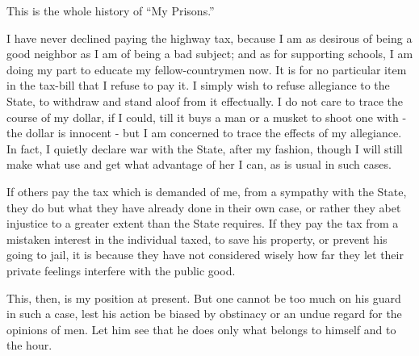 \documentclass[letterpaper,12pt,english]{sphinxmanual}
\begin{document}
This is the whole history of ``My Prisons.''

I have never declined paying the highway tax, because I am as desirous of being a good neighbor as I am of being a bad subject; and as for supporting schools, I am doing my part to educate my fellow-countrymen now. It is for no particular item in the tax-bill that I refuse to pay it. I simply wish to refuse allegiance to the State, to withdraw and stand aloof from it effectually. I do not care to trace the course of my dollar, if I could, till it buys a man or a musket to shoot one with - the dollar is innocent - but I am concerned to trace the effects of my allegiance. In fact, I quietly declare war with the State, after my fashion, though I will still make what use and get what advantage of her I can, as is usual in such cases.

If others pay the tax which is demanded of me, from a sympathy with the State, they do but what they have already done in their own case, or rather they abet injustice to a greater extent than the State requires. If they pay the tax from a mistaken interest in the individual taxed, to save his property, or prevent his going to jail, it is because they have not considered wisely how far they let their private feelings interfere with the public good.

This, then, is my position at present. But one cannot be too much on his guard in such a case, lest his action be biased by obstinacy or an undue regard for the opinions of men. Let him see that he does only what belongs to himself and to the hour.
\end{document}
